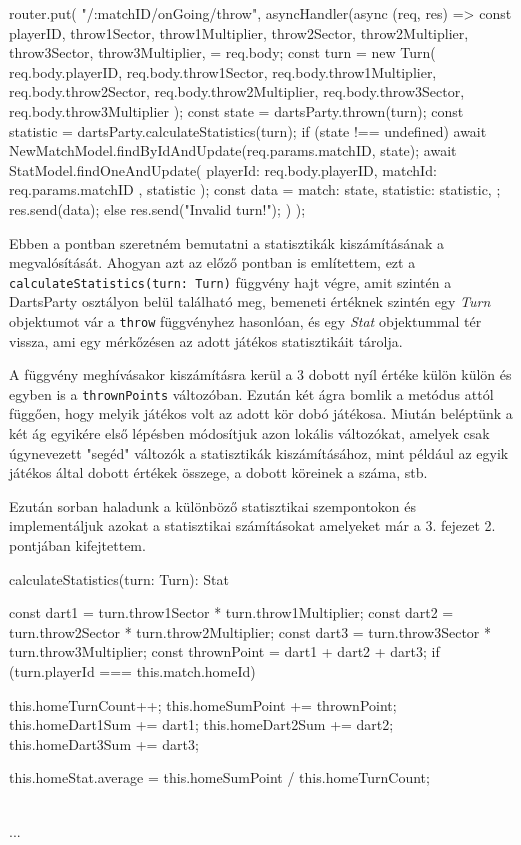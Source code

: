 \begin{cpp}
router.put(
  "/:matchID/onGoing/throw",
  asyncHandler(async (req, res) => {
    const {
      playerID,
      throw1Sector,
      throw1Multiplier,
      throw2Sector,
      throw2Multiplier,
      throw3Sector,
      throw3Multiplier,
    } = req.body;
    const turn = new Turn(
      req.body.playerID,
      req.body.throw1Sector,
      req.body.throw1Multiplier,
      req.body.throw2Sector,
      req.body.throw2Multiplier,
      req.body.throw3Sector,
      req.body.throw3Multiplier
    );
    const state = dartsParty.thrown(turn);
    const statistic = dartsParty.calculateStatistics(turn);
    if (state !== undefined) {
      await NewMatchModel.findByIdAndUpdate(req.params.matchID, state);
      await StatModel.findOneAndUpdate(
        { playerId: req.body.playerID, matchId: req.params.matchID },
        statistic
      );
      const data = {
        match: state,
        statistic: statistic,
      };
      res.send(data);
    } else {
      res.send("Invalid turn!");
    }
  })
);
\end{cpp}

Ebben a pontban szeretném bemutatni a statisztikák kiszámításának a megvalósítását. Ahogyan azt az előző pontban is említettem, ezt a \texttt{calculateStatistics(turn: Turn)} függvény hajt végre, amit szintén a DartsParty osztályon belül található meg, bemeneti értéknek szintén egy \textit{Turn} objektumot vár a  \texttt{throw} függvényhez hasonlóan, és egy  \textit{Stat} objektummal tér vissza, ami egy mérkőzésen az adott játékos statisztikáit tárolja.

A függvény meghívásakor kiszámításra kerül a 3 dobott nyíl értéke külön külön és egyben is a \texttt{thrownPoints} változóban. Ezután két ágra bomlik a metódus attól függően, hogy melyik játékos volt az adott kör dobó játékosa. Miután beléptünk a két ág egyikére első lépésben módosítjuk azon lokális változókat, amelyek csak úgynevezett "segéd" változók a statisztikák kiszámításához, mint például az egyik játékos által dobott értékek összege, a dobott köreinek a száma, stb.

Ezután sorban haladunk a különböző statisztikai szempontokon és implementáljuk azokat a statisztikai számításokat amelyeket már a 3. fejezet 2. pontjában kifejtettem. 

\begin{cpp}
calculateStatistics(turn: Turn): Stat {
  const dart1 = turn.throw1Sector * turn.throw1Multiplier;
  const dart2 = turn.throw2Sector * turn.throw2Multiplier;
  const dart3 = turn.throw3Sector * turn.throw3Multiplier;
  const thrownPoint = dart1 + dart2 + dart3;
  if (turn.playerId === this.match.homeId) {
   this.homeTurnCount++;
   this.homeSumPoint += thrownPoint;
   this.homeDart1Sum += dart1;
   this.homeDart2Sum += dart2;
   this.homeDart3Sum += dart3;
      
   this.homeStat.average = this.homeSumPoint / this.homeTurnCount;
  }
  
  \\...
}      
\end{cpp}

